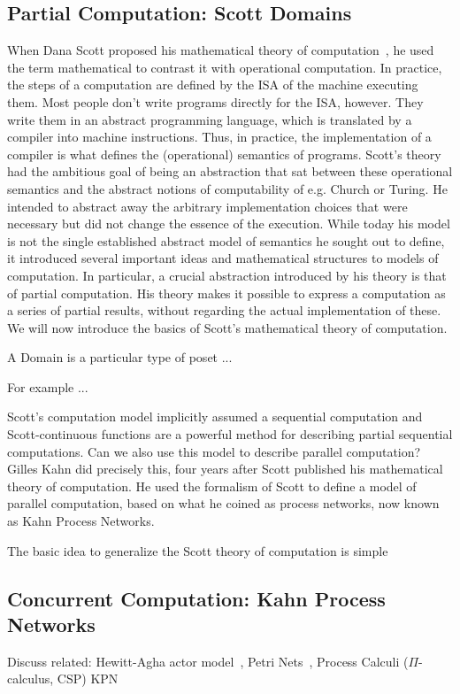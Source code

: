\subsection{Partial Computation: Scott Domains}

When Dana Scott proposed his mathematical theory of computation~\cite{scott1970}, he used the term mathematical to contrast it with operational computation.
In practice, the steps of a computation are defined by the \ac{ISA} of the machine executing them.
Most people don't write programs directly for the \ac{ISA}, however. They write them in an abstract programming language, which is translated by a compiler into machine instructions.
Thus, in practice, the implementation of a compiler is what defines the (operational) semantics of programs.
Scott's theory had the ambitious goal of being an abstraction that sat between these operational semantics and the abstract notions of computability of e.g. Church or Turing.
He intended to abstract away the arbitrary implementation choices that were necessary but did not change the essence of the execution.
While today his model is not the single established abstract model of semantics he sought out to define, it introduced several important ideas and mathematical structures to models of computation.
In particular, a crucial abstraction introduced by his theory is that of partial computation.
His theory makes it possible to express a computation as a series of partial results, without regarding the actual implementation of these.
We will now introduce the basics of Scott's mathematical theory of computation.


A Domain is a particular type of \ac{poset} ... 

For example ...


Scott's computation model implicitly assumed a sequential computation and Scott-continuous functions are a powerful method for describing partial sequential computations.
Can we also use this model to describe parallel computation?
Gilles Kahn did precisely this, four years after Scott published his mathematical theory of computation. 
He used the formalism of Scott to define a model of parallel computation, based on what he coined as process networks, now known as Kahn Process Networks.

The basic idea to generalize the Scott theory of computation is simple



\subsection{Concurrent Computation: Kahn Process Networks}
Discuss related: Hewitt-Agha actor model~\cite{DBLP:conf/ijcai/HewittBS73,Agha:86:Actors}, Petri Nets~\cite{petri1962nets}, Process Calculi ($\Pi$-calculus, \ac{CSP})
\Blindtext[10]\ac{KPN}~\cite{kahn74}

